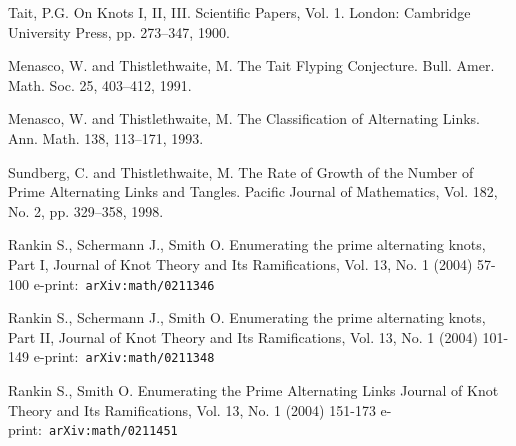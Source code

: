 \begin{thebibliography}{99}
	Tait, P.G. On Knots I, II, III. Scientific Papers, Vol. 1. London: Cambridge University Press, pp. 273--347, 1900.

	Menasco, W. and Thistlethwaite, M. The Tait Flyping Conjecture. Bull. Amer. Math. Soc. 25, 403--412, 1991. 

	Menasco, W. and Thistlethwaite, M. The Classification of Alternating Links. Ann. Math. 138, 113--171, 1993.

	Sundberg, C. and Thistlethwaite, M. The Rate of Growth of the Number of Prime Alternating Links and Tangles.
	Pacific Journal of Mathematics, Vol. 182, No. 2, pp. 329--358, 1998.

	Rankin S., Schermann J., Smith O. Enumerating the prime alternating knots, Part	I,
	Journal of Knot Theory and Its Ramifications, Vol. 13, No. 1 (2004) 57-100
	e-print:~\texttt{arXiv:math/0211346}

	Rankin S., Schermann J., Smith O. Enumerating the prime alternating knots, Part II,
	Journal of Knot Theory and Its Ramifications, Vol. 13, No. 1 (2004) 101-149
	e-print:~\texttt{arXiv:math/0211348}

	Rankin S., Smith O. Enumerating the Prime Alternating Links
	Journal of Knot Theory and Its Ramifications, Vol. 13, No. 1 (2004) 151-173
	e-print:~\texttt{arXiv:math/0211451}

\end{thebibliography}
